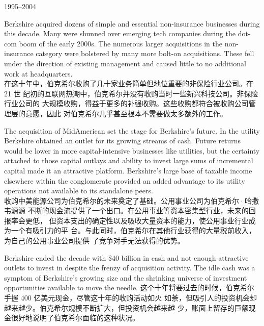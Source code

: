 \begin{section}{1995--2004}
\begin{verseparallel}
  {
    Berkshire acquired dozens of simple and essential non-insurance businesses
    during this decade. Many were shunned over emerging tech companies during
    the dot-com boom of the early 2000s. The numerous larger acquisitions in the
    non-insurance category were bolstered by many more bolt-on acquisitions.
    These fell under the direction of existing management and caused little to
    no additional work at headquarters. \\
  }
  {
    在这十年中，伯克希尔收购了几十家业务简单但地位重要的非保险行业公司。在 21 世
    纪初的互联网热潮中，伯克希尔并没有收购当时一些新兴科技公司。非保险行业公司的
    大规模收购，得益于更多的补强收购。这些收购都符合被收购公司管理层的意愿，因此
    对伯克希尔几乎甚至根本不需要做太多额外的工作。
  }
\end{verseparallel}

\begin{verseparallel}
  {
    The acquisition of MidAmerican set the stage for Berkshire's future. In the
    utility Berkshire obtained an outlet for its growing streams of cash. Future
    returns would be lower in more capital-intensive businesses like utilities,
    but the certainty attached to those capital outlays and ability to invest
    large sums of incremental capital made it an attractive platform.
    Berkshire's large base of taxable income elsewhere within the conglomerate
    provided an added advantage to its utility operations not available to its
    standalone peers. \\
  }
  {
    收购中美能源公司为伯克希尔的未来奠定了基础。公用事业公司为伯克希尔·哈撒韦源源
    不断的现金流提供了一个出口。在公用事业等资本密集型行业，未来的回报率会更低，
    但资本支出的确定性以及吸收大量资本的能力，使公用事业行业成为一个有吸引力的平
    台。与此同时，伯克希尔在其他行业获得的大量税前收入，为自己的公用事业公司提供
    了竞争对手无法获得的优势。
  }
\end{verseparallel}

\begin{verseparallel}
  {
    Berkshire ended the decade with \$40 billion in cash and not enough
    attractive outlets to invest in despite the frenzy of acquisition activity.
    The idle cash was a symptom of Berkshire's growing size and the shrinking
    universe of investment opportunities available to move the needle.
  }
  {
    这个十年将要过去的时候，伯克希尔手握 400 亿美元现金，尽管这十年的收购活动如火
    如荼，但吸引人的投资机会却越来越少。伯克希尔规模不断扩大，但投资机会越来越
    少，账面上留存的巨额现金很好地说明了伯克希尔面临的这种状况。
  }
\end{verseparallel}

\end{section}

